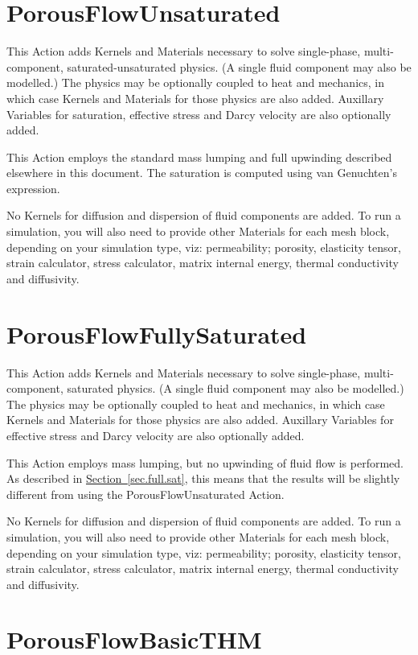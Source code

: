 \documentclass[12pt]{report}
\begin{document}
\section{PorousFlowUnsaturated}

This Action adds Kernels and Materials necessary to solve
single-phase, multi-component, saturated-unsaturated physics.
(A single fluid component may also be modelled.)  The
physics may be optionally coupled to heat and mechanics, in which case
Kernels and Materials for those physics are also added.  Auxillary
Variables for saturation, effective stress and Darcy velocity are also
optionally added.

This Action employs the standard mass lumping and full upwinding
described elsewhere in this document.  The saturation is computed
using van Genuchten's expression.

No Kernels for diffusion and dispersion of fluid components are
added.  To run a simulation, you will also need to provide other
Materials for each mesh block, depending on your simulation type, viz:
permeability; porosity, elasticity tensor, strain calculator, stress
calculator, matrix internal energy, thermal conductivity and
diffusivity.

\section{PorousFlowFullySaturated}

This Action adds Kernels and Materials necessary to solve
single-phase, multi-component, saturated physics.  (A single fluid
component may also be modelled.)  The physics may be optionally
coupled to heat and mechanics, in which case Kernels and Materials for
those physics are also added.  Auxillary Variables for effective
stress and Darcy velocity are also optionally added.

This Action employs mass lumping, but no upwinding of fluid flow is
performed.  As described in
\hyperref[sec.full.sat]{Section~\ref*{sec.full.sat}}, this means that
the results will be slightly different from using the
PorousFlowUnsaturated Action.

No Kernels for diffusion and dispersion of fluid components are
added.  To run a simulation, you will also need to provide other
Materials for each mesh block, depending on your simulation type, viz:
permeability; porosity, elasticity tensor, strain calculator, stress
calculator, matrix internal energy, thermal conductivity and
diffusivity.

\section{PorousFlowBasicTHM}
\end{document}
